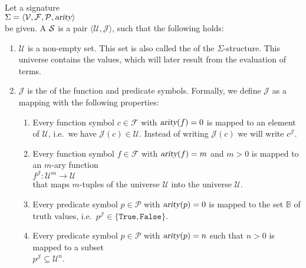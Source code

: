 \begin{Definition}[Structure]
    Let a signature \\[0.2cm]
    \hspace*{1.3cm} $\Sigma = \langle \mathcal{V}, \mathcal{F}, \mathcal{P}, \textsl{arity} \rangle$ \\[0.2cm]
    be given. A  $\mathcal{S}$ is a
    pair $\langle \mathcal{U}, \mathcal{J} \rangle$, such that the following holds:
    \begin{enumerate}
        \item $\mathcal{U}$ is a non-empty set. This set is also called the
                of the $\Sigma$-structure. This universe contains the values,
              which will later result from the evaluation of terms.
        \item $\mathcal{J}$ is the   of the function and predicate symbols.
              Formally, we define $\mathcal{J}$ as a mapping with the following properties:
        \begin{enumerate}
        \item Every function symbol $c \in \mathcal{F}$ with $\textsl{arity}(f) = 0$ is mapped to an element
              of $\mathcal{U}$, i.e.~we have $\mathcal{J}(c) \in \mathcal{U}$.  Instead of writing
              $\mathcal{J}(c)$ we will write $c^{\mathcal{J}}$.
        \item Every function symbol $f \in \mathcal{F}$ with $\textsl{arity}(f) = m$ and $m > 0$ is mapped to
              an $m$-ary function \\[0.2cm]
              \hspace*{1.3cm}
              $f^\mathcal{J}\colon \mathcal{U}^m \rightarrow \mathcal{U}$ \\[0.2cm]
              that maps $m$-tuples of the universe $\mathcal{U}$ into the universe $\mathcal{U}$.
        \item Every predicate symbol $p \in \mathcal{P}$ with $\textsl{arity}(p) = 0$ is mapped to
              the set $\mathbb{B}$ of truth values, i.e.~$p^{\mathcal{J}} \in \{ \mathtt{True}, \mathtt{False}\}$.
        \item Every predicate symbol $p \in \mathcal{P}$ with $\textsl{arity}(p) = n$ such that $n > 0$ is mapped to
              a subset \\[0.2cm]
              \hspace*{1.3cm} 
              $p^\mathcal{J} \subseteq \mathcal{U}^n$. \\[0.2cm]

\end{enumerate}
\end{enumerate}
\end{Definition}
